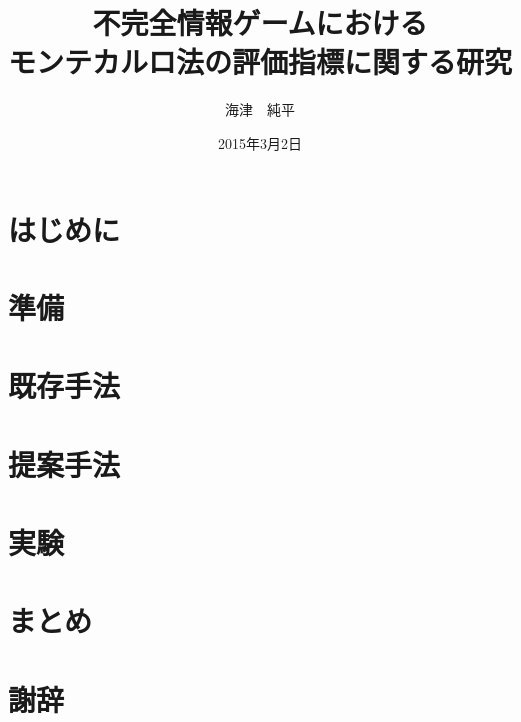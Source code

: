 \documentclass[12pt]{jbachelor}
\title{不完全情報ゲームにおける\\モンテカルロ法の評価指標に関する研究}
\author{海津　純平}
\date{2015年3月2日}
\begin{document}
\maketitle
\tableofcontents

\newpage
{}


\chapter{はじめに}

\chapter{準備}

\chapter{既存手法}

\chapter{提案手法}

\chapter{実験}

\chapter{まとめ}






\chapter*{謝辞}
%

\end{document}
